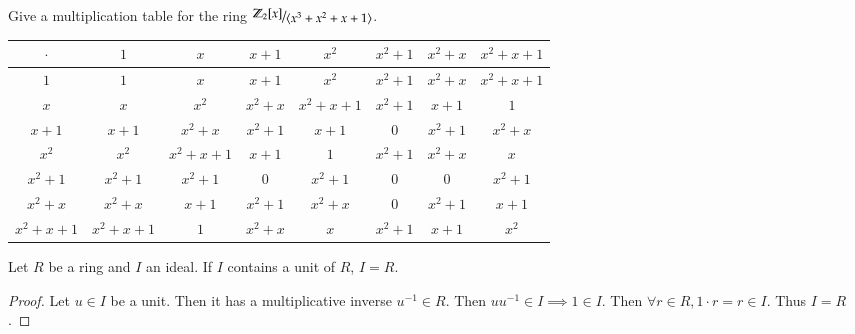 \exercise Give a multiplication table for the ring $\nicefrac{\Z_2[x]}{\langle x^3 + x^2 + x + 1 \rangle}$. 

\begin{center}
\begin{tabular}{c|ccccccc}
$\cdot$       & $1$           & $x$           & $x+1$     & $x^2$         & $x^2 + 1$ & $x^2 + x$ & $x^2 + x + 1$ \\ \hline
$1$           & $1$           & $x$           & $x+1$     & $x^2$         & $x^2 + 1$ & $x^2 + x$ & $x^2 + x + 1$ \\
$x$           & $x$           & $x^2$         & $x^2 + x$ & $x^2 + x + 1$ & $x^2 + 1$ & $x+1$     & $1$           \\
$x+1$         & $x+1$         & $x^2 + x$     & $x^2 + 1$ & $x+1$         & $0$       & $x^2 + 1$ & $x^2 + x$     \\
$x^2$         & $x^2$         & $x^2 + x + 1$ & $x+1$     & $1$           & $x^2+1$   & $x^2+x$   & $x$           \\
$x^2 + 1$     & $x^2 + 1$     & $x^2 + 1$     & $0$       & $x^2+1$       & $0$       & $0$       & $x^2 + 1$     \\
$x^2 + x$     & $x^2 + x$     & $x+1$         & $x^2 + 1$ & $x^2+x$       & $0$       & $x^2 + 1$ & $x + 1$       \\
$x^2 + x + 1$ & $x^2 + x + 1$ & $1$           & $x^2 + x$ & $x$           & $x^2 + 1$ & $x + 1$   & $x^2$        
\end{tabular}
	
\end{center}

\exercise Let $R$ be a ring and $I$ an ideal. If $I$ contains a unit of $R$, $I=R$. 
\begin{proof}
	Let $u\in I$ be a unit. Then it has a multiplicative inverse $u^{-1}\in R$. Then $uu^{-1}\in I\implies 1\in I$. Then $\forall r\in R, 1\cdot r = r\in I$. Thus $I = R$. 
\end{proof}


